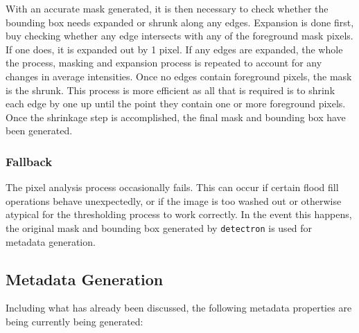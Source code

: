 \documentclass[screen,review]{acmart}
\begin{document}
With an accurate mask generated, it is then necessary to check whether the bounding box needs expanded or shrunk along any edges. Expansion is done first, buy checking whether any edge intersects with any of the foreground mask pixels. If one does, it is expanded out by 1 pixel. If any edges are expanded, the whole the process, masking and expansion process is repeated to account for any changes in average intensities. Once no edges contain foreground pixels, the mask is the shrunk. This process is more efficient as all that is required is to shrink each edge by one up until the point they contain one or more foreground pixels. Once the shrinkage step is accomplished, the final mask and bounding box have been generated.

\subsubsection{Fallback} The pixel analysis process occasionally fails. This can occur if certain flood fill operations behave unexpectedly, or if the image is too washed out or otherwise atypical for the thresholding process to work correctly. In the event this happens, the original mask and bounding box generated by \verb|detectron| is used for metadata generation.
\subsection{Metadata Generation}
Including what has already been discussed, the following metadata properties are being currently being generated:
\end{document}
